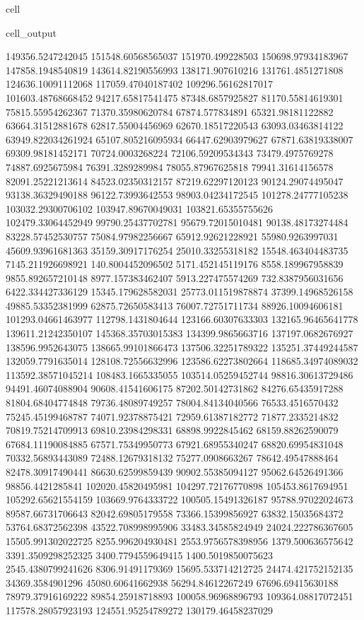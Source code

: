 \documentclass[letterpaper,10pt,english]{jupyterBook}
\begin{document}
\begin{sphinxuseclass}{cell}
\begin{sphinxVerbatimOutput}
\begin{sphinxuseclass}{cell_output}
\begin{sphinxVerbatim}[commandchars=\\\{\}]
149356.5247242045  151548.60568565037  151970.499228503  150698.97934183967  147858.1948540819  143614.82190556993  138171.907610216  131761.4851271808  124636.10091112068  117059.47040187402  109296.56162817017  101603.48768668452  94217.65817541475  87348.6857925827  81170.55814619301  75815.55954262367  71370.35980620784  67874.577834891  65321.98181122882  63664.31512881678  62817.55004456969  62670.18517220543  63093.03463814122  63949.822034261924  65107.805216095934  66447.62903979627  67871.63819338007  69309.98181452171  70724.0003268224  72106.59209534343  73479.4975769278  74887.6925675984  76391.3289289984  78055.87967625818  79941.31614156578  82091.25221213614  84523.02350312157  87219.62297120123  90124.29074495047  93138.36329490188  96122.73993642553  98903.04234172545  101278.24777105238  103032.29300706102  103947.89670049031  103821.65355755626  102479.33064452949  99790.25437702781  95679.72015010481  90138.48173274484  83228.57452530757  75084.97982256667  65912.92621228921  55980.9263997031  45609.93961681363  35159.30917176254  25010.33255318182  15548.463404483735  7145.211926698921  140.8004452096502  \PYGZhy{}5171.452145119176  \PYGZhy{}8558.189967958839  \PYGZhy{}9855.892657210148  \PYGZhy{}8977.157383462407  \PYGZhy{}5913.227475574269  \PYGZhy{}732.8387956031656  6422.334427336129  15345.179628582031  25773.011519878874  37399.14968526158  49885.53352381999  62875.72650583413  76007.72751711734  88926.10094606181  101293.04661463977  112798.1431804644  123166.60307633303  132165.96465641778  139611.21242350107  145368.35703015383  
134399.9865663716  137197.0682676927  138596.9952643075  138665.99101866473  137506.32251789322  135251.37449244587  132059.7791635014  128108.72556632996  123586.62273802664  118685.34974089032  113592.38571045214  108483.1665335055  103514.05259452744  98816.30613729486  94491.46074088904  90608.41541606175  87202.50142731862  84276.65435917288  81804.68404774848  79736.48089749257  78004.84134040566  76533.4516570432  75245.45199468787  74071.92378875421  72959.61387182772  71877.2335214832  70819.75214709913  69810.23984298331  68898.9922845462  68159.88262590079  67684.11190084885  67571.75349950773  67921.68955340247  68820.69954831048  70332.56893443089  72488.12679318132  75277.0908663267  78642.49547888464  82478.30917490441  86630.62599859439  90902.55385094127  95062.64526491366  98856.4421285841  102020.45820495981  104297.72176770898  105453.8617694951  105292.65621554159  103669.9764333722  100505.15491326187  95788.97022024673  89587.66731706643  82042.69805179558  73366.15399856927  63832.15035684372  53764.68372562398  43522.708998995906  33483.34585824949  24024.222786367605  15505.991302022725  8255.996204930481  2553.9756578398956  \PYGZhy{}1379.500636575642  \PYGZhy{}3391.3509298252325  \PYGZhy{}3400.7794559649415  \PYGZhy{}1400.5019850075623  2545.4380799241626  8306.91491179369  15695.533714212725  24474.421752152135  34369.3584901296  45080.60641662938  56294.84612267249  67696.69415630188  78979.37916169222  89854.25918718893  100058.96968896793  109364.08817072451  117578.28057923193  124551.95254789272  130179.46458237029  

\end{sphinxVerbatim}
\end{sphinxuseclass}
\end{sphinxVerbatimOutput}
\end{sphinxuseclass}
\end{document}
